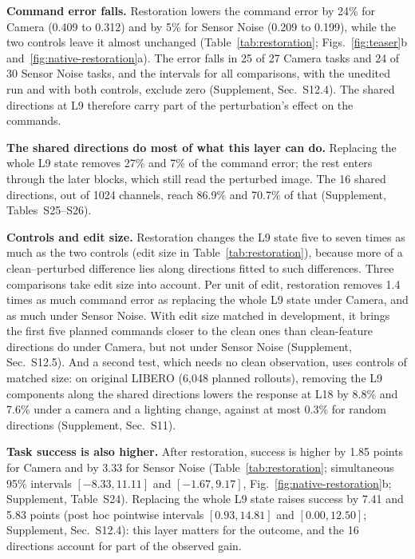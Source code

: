 \textbf{Command error falls.} Restoration lowers the command error by 24\% for Camera (0.409 to 0.312) and by 5\% for Sensor Noise (0.209 to 0.199), while the two controls leave it almost unchanged (Table~\ref{tab:restoration}; Figs.~\ref{fig:teaser}b and~\ref{fig:native-restoration}a). The error falls in 25 of 27 Camera tasks and 24 of 30 Sensor Noise tasks, and the intervals for all comparisons, with the unedited run and with both controls, exclude zero (Supplement, Sec.~S12.4). The shared directions at L9 therefore carry part of the perturbation's effect on the commands.

\textbf{The shared directions do most of what this layer can do.} Replacing the whole L9 state removes 27\% and 7\% of the command error; the rest enters through the later blocks, which still read the perturbed image. The 16 shared directions, out of 1024 channels, reach 86.9\% and 70.7\% of that (Supplement, Tables~S25--S26).

\textbf{Controls and edit size.} Restoration changes the L9 state five to seven times as much as the two controls (edit size in Table~\ref{tab:restoration}), because more of a clean--perturbed difference lies along directions fitted to such differences. Three comparisons take edit size into account. Per unit of edit, restoration removes 1.4 times as much command error as replacing the whole L9 state under Camera, and as much under Sensor Noise. With edit size matched in development, it brings the first five planned commands closer to the clean ones than clean-feature directions do under Camera, but not under Sensor Noise (Supplement, Sec.~S12.5). And a second test, which needs no clean observation, uses controls of matched size: on original LIBERO (6,048 planned rollouts), removing the L9 components along the shared directions lowers the response at L18 by 8.8\% and 7.6\% under a camera and a lighting change, against at most 0.3\% for random directions (Supplement, Sec.~S11).

\textbf{Task success is also higher.} After restoration, success is higher by 1.85 points for Camera and by 3.33 for Sensor Noise (Table~\ref{tab:restoration}; simultaneous 95\% intervals $[-8.33,11.11]$ and $[-1.67,9.17]$, Fig.~\ref{fig:native-restoration}b; Supplement, Table~S24). Replacing the whole L9 state raises success by 7.41 and 5.83 points (post hoc pointwise intervals $[0.93,14.81]$ and $[0.00,12.50]$; Supplement, Sec.~S12.4): this layer matters for the outcome, and the 16 directions account for part of the observed gain.
